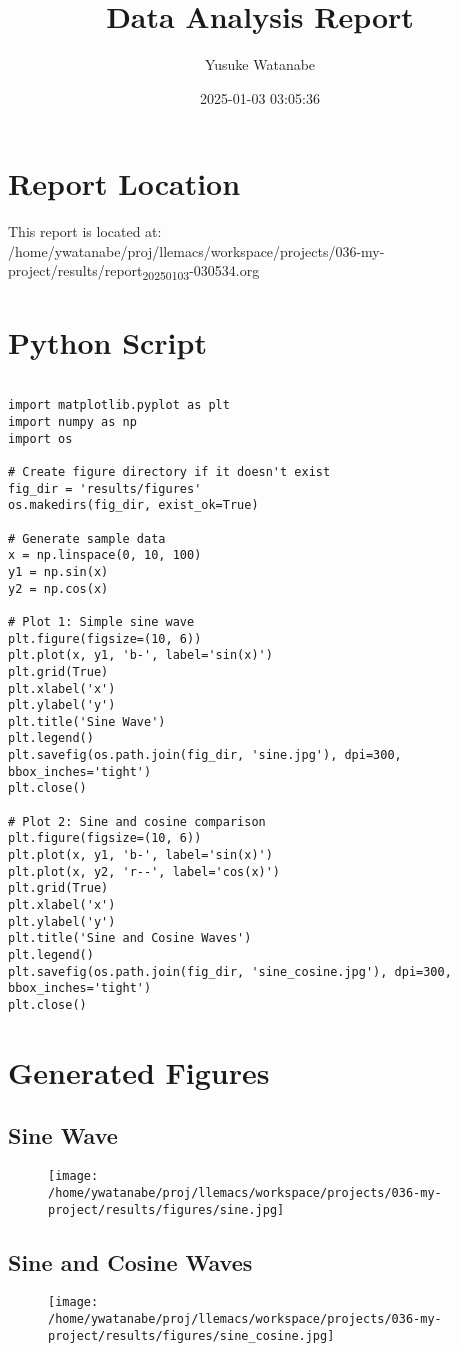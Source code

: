 \documentclass[11pt]{article}
\author{Yusuke Watanabe}
\date{2025-01-03 03:05:36}
\title{Data Analysis Report}
\begin{document}
\maketitle

\section{Report Location}
\label{sec:orgd972262}
This report is located at: /home/ywatanabe/proj/llemacs/workspace/projects/036-my-project/results/report\textsubscript{20250103}-030534.org

\section{Python Script}
\label{sec:orgf31199b}
\begin{verbatim}

import matplotlib.pyplot as plt
import numpy as np
import os

# Create figure directory if it doesn't exist
fig_dir = 'results/figures'
os.makedirs(fig_dir, exist_ok=True)

# Generate sample data
x = np.linspace(0, 10, 100)
y1 = np.sin(x)
y2 = np.cos(x)

# Plot 1: Simple sine wave
plt.figure(figsize=(10, 6))
plt.plot(x, y1, 'b-', label='sin(x)')
plt.grid(True)
plt.xlabel('x')
plt.ylabel('y')
plt.title('Sine Wave')
plt.legend()
plt.savefig(os.path.join(fig_dir, 'sine.jpg'), dpi=300, bbox_inches='tight')
plt.close()

# Plot 2: Sine and cosine comparison
plt.figure(figsize=(10, 6))
plt.plot(x, y1, 'b-', label='sin(x)')
plt.plot(x, y2, 'r--', label='cos(x)')
plt.grid(True)
plt.xlabel('x')
plt.ylabel('y')
plt.title('Sine and Cosine Waves')
plt.legend()
plt.savefig(os.path.join(fig_dir, 'sine_cosine.jpg'), dpi=300, bbox_inches='tight')
plt.close()
\end{verbatim}

\section{Generated Figures}
\label{sec:orgbdf0521}
\subsection{Sine Wave}
\label{sec:org6a3606c}
\begin{figure}[H]
\centering
\texttt{[image: /home/ywatanabe/proj/llemacs/workspace/projects/036-my-project/results/figures/sine.jpg]}
\end{figure}

\subsection{Sine and Cosine Waves}
\label{sec:org4324a54}
\begin{figure}[H]
\centering
\texttt{[image: /home/ywatanabe/proj/llemacs/workspace/projects/036-my-project/results/figures/sine\_cosine.jpg]}
\end{figure}
\end{document}
